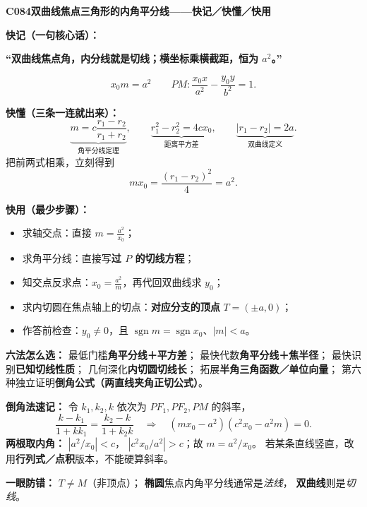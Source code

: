 \clearpage
\begin{summarybox}
\textbf{C084\quad 双曲线焦点三角形的内角平分线——快记／快懂／快用}

\textbf{快记（一句核心话）：}
\begin{center}
\textbf{“双曲线焦点角，内分线就是切线；横坐标乘横截距，恒为 $a^2$。”}
\end{center}
\[
\boxed{x_0m=a^2}\qquad
\boxed{PM:\frac{x_0x}{a^2}-\frac{y_0y}{b^2}=1}.
\]

\textbf{快懂（三条一连就出来）：}
\[
\underbrace{m=c\frac{r_1-r_2}{r_1+r_2}}_{\text{角平分线定理}},\qquad
\underbrace{r_1^2-r_2^2=4cx_0}_{\text{距离平方差}},\qquad
\underbrace{|r_1-r_2|=2a}_{\text{双曲线定义}}.
\]
把前两式相乘，立刻得到
\[
mx_0=\frac{(r_1-r_2)^2}{4}=a^2.
\]

\textbf{快用（最少步骤）：}
\begin{itemize}
  \item 求轴交点：直接 $\displaystyle m=\frac{a^2}{x_0}$；
  \item 求角平分线：直接写\textbf{过 $P$ 的切线方程}；
  \item 知交点反求点：$\displaystyle x_0=\frac{a^2}{m}$，再代回双曲线求 $y_0$；
  \item 求内切圆在焦点轴上的切点：\textbf{对应分支的顶点} $T=(\pm a,0)$；
  \item 作答前检查：$y_0\ne0$，且 $\operatorname{sgn}m=\operatorname{sgn}x_0$、$|m|<a$。
\end{itemize}

\textbf{六法怎么选：}
最低门槛\textbf{角平分线＋平方差}；
最快代数\textbf{角平分线＋焦半径}；
最快识别\textbf{已知切线性质}；
几何深化\textbf{内切圆切线长}；
拓展\textbf{半角三角函数／单位向量}；
第六种独立证明\textbf{倒角公式（两直线夹角正切公式）}。

\textbf{倒角法速记：}
令 $k_1,k_2,k$ 依次为 $PF_1,PF_2,PM$ 的斜率，
\[
\frac{k-k_1}{1+kk_1}=\frac{k_2-k}{1+k_2k}
\quad\Longrightarrow\quad
\boxed{(mx_0-a^2)(c^2x_0-a^2m)=0}.
\]
\textbf{两根取内角：} $\left|a^2/x_0\right|<c$，
$\left|c^2x_0/a^2\right|>c$；故 $m=a^2/x_0$。
若某条直线竖直，改用\textbf{行列式／点积}版本，不能硬算斜率。

\textbf{一眼防错：} $\boxed{T\ne M}$（非顶点）；
\textbf{椭圆}焦点内角平分线通常是\emph{法线}，
\textbf{双曲线}则是\emph{切线}。
\end{summarybox}
